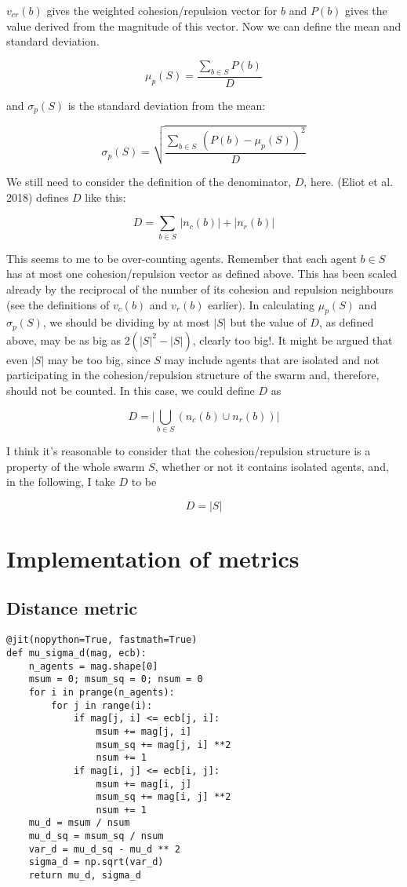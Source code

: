 \documentclass{article}
\begin{document}
$v_{cr}(b)$ gives the weighted cohesion/repulsion vector for $b$ and $P(b)$ gives the value derived from the magnitude of this vector. Now we can define the mean and standard deviation.

$$
\mu_p(S) = \frac{\sum_{b \in S} P(b)}{D}
$$

and $\sigma_p(S)$ is the standard deviation from the mean:

$$
\sigma_p(S) = \sqrt{\frac{\sum_{b \in S}\, (P(b) - \mu_p(S))^2}{D}}
$$

We still need to consider the definition of the denominator, $D$, here. (Eliot et al. 2018) defines $D$ like this:

$$
D = \sum_{b \in S}\, \big\lvert n_c(b) \big\rvert + \big\lvert n_r(b) \big\rvert
$$

This seems to me to be over-counting agents. Remember that each agent $b \in S$ has at most one cohesion/repulsion vector as defined above. This has been scaled already by the reciprocal of the number of its cohesion and repulsion neighbours (see the definitions of $v_c(b)$ and $v_r(b)$ earlier). In calculating $\mu_p(S)$ and $\sigma_p(S)$, we should be dividing by at most $\lvert S \rvert$ but the value of $D$, as defined above, may be as big as $2(\lvert S\rvert^2 - \lvert S\rvert)$, clearly too big!. It might be argued that even $\lvert S \rvert$ may be too big, since $S$ may include agents that are isolated and not participating in the cohesion/repulsion structure of the swarm and, therefore, should not be counted. In this case, we could define $D$ as

$$
D = \bigg\lvert \bigcup_{b \in S} (n_c(b) \cup n_r(b)) \bigg\rvert
$$

I think it's reasonable to consider that the cohesion/repulsion structure is a property of the whole swarm $S$, whether or not it contains isolated agents, and, in the following, I take $D$ to be

$$
D = \lvert S \rvert
$$

\section{Implementation of metrics}

\subsection{Distance metric}
\begin{verbatim}
@jit(nopython=True, fastmath=True)
def mu_sigma_d(mag, ecb):
    n_agents = mag.shape[0]
    msum = 0; msum_sq = 0; nsum = 0
    for i in prange(n_agents):
        for j in range(i):
            if mag[j, i] <= ecb[j, i]:
                msum += mag[j, i]
                msum_sq += mag[j, i] **2
                nsum += 1
            if mag[i, j] <= ecb[i, j]:
                msum += mag[i, j]
                msum_sq += mag[i, j] **2
                nsum += 1
    mu_d = msum / nsum
    mu_d_sq = msum_sq / nsum
    var_d = mu_d_sq - mu_d ** 2
    sigma_d = np.sqrt(var_d)
    return mu_d, sigma_d
\end{verbatim}
\end{document}
